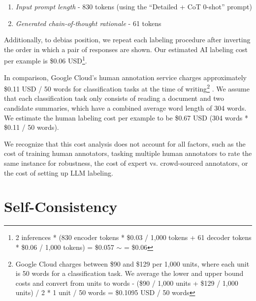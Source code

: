 \documentclass[11pt]{article}
\begin{document}
\begin{enumerate}
    \itemsep0em 
    \item \textit{Input prompt length} - 830 tokens (using the ``Detailed + CoT 0-shot'' prompt)
    \item \textit{Generated chain-of-thought rationale} - 61 tokens
\end{enumerate}

Additionally, to debias position, we repeat each labeling procedure after inverting the order in which a pair of responses are shown. Our estimated AI labeling cost per example is \$0.06 USD\footnote{2 inferences * (830 encoder tokens * \$0.03 / 1,000 tokens + 61 decoder tokens * \$0.06 / 1,000 tokens) = \$0.057 $\sim$ = \$0.06}.

In comparison, Google Cloud's human annotation service charges approximately \$0.11 USD / 50 words for classification tasks at the time of writing\footnote{Google Cloud charges between \$90 and \$129 per 1,000 units, where each unit is 50 words for a classification task. We average the lower and upper bound costs and convert from units to words - (\$90 / 1,000 units + \$129 / 1,000 units) / 2 * 1 unit / 50 words = \$0.1095 USD / 50 words} \citep{googlecloudpricing}. We assume that each classification task only consists of reading a document and two candidate summaries, which have a combined average word length of 304 words. We estimate the human labeling cost per example to be \$0.67 USD (304 words * \$0.11 / 50 words).

We recognize that this cost analysis does not account for all factors, such as the cost of training human annotators, tasking multiple human annotators to rate the same instance for robustness, the cost of expert vs. crowd-sourced annotators, or the cost of setting up LLM labeling.

\section{Self-Consistency}
\label{sec:self_consistency}

\begin{table}[h!]
\centering
\setlength{\tabcolsep}{1pt}
\caption{Sampling multiple chain-of-thought rationales with $T > 0$ results in lower alignment with human preferences. Note: 1 and 16 samples represent 2 and 32 inferences given our position debiasing technique (see Section \ref{sec:m_position_debiasing}).}
\label{table:self_consistency}
\end{table}
\end{document}
